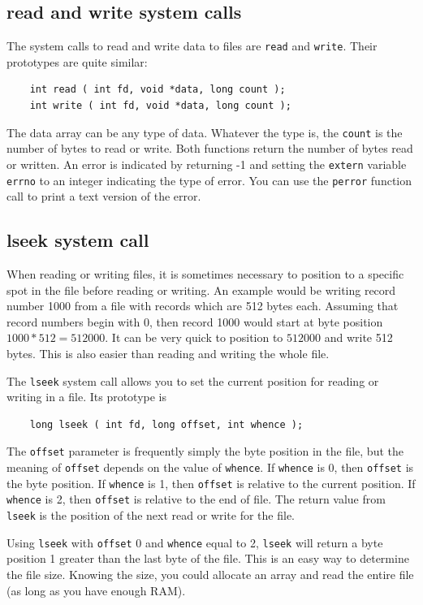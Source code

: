 \documentclass[11pt,b5paper]{book}
\begin{document}
\subsection{read and write system calls}

The system calls to read and write data to files are {\tt read} and {\tt write}.  
Their prototypes are quite similar:
\begin{verbatim}
    int read ( int fd, void *data, long count );
    int write ( int fd, void *data, long count );
\end{verbatim}
The data array can be any type of data.
Whatever the type is, the {\tt count} is the number of bytes to read or write.
Both functions return the number of bytes read or written.
An error is indicated by returning -1 and setting the {\tt extern} variable {\tt errno} to an
integer indicating the type of error.
You can use the {\tt perror} function call to print a text version of the
error.

\subsection{lseek system call}

When reading or writing files, it is sometimes necessary to position to a specific spot in the file before 
reading or writing.
An example would be writing record number 1000 from a file with records which are 512 bytes each.
Assuming that record numbers begin with 0, then record 1000 would start at byte position $1000*512=512000$.
It can be very quick to position to $512000$ and write 512 bytes.
This is also easier than reading and writing the whole file.

The {\tt lseek} system call allows you to set the current position for reading or writing in a file.
Its prototype is
\begin{verbatim}
    long lseek ( int fd, long offset, int whence );
\end{verbatim}
The {\tt offset} parameter is frequently simply the byte position in the file, but the meaning of {\tt offset} depends
on the value of {\tt whence}.
If {\tt whence} is 0, then {\tt offset} is the byte position.
If {\tt whence} is 1, then {\tt offset} is relative to the current position.
If {\tt whence} is 2, then {\tt offset} is relative to the end of file.
The return value from {\tt lseek} is the position of the next read or write for the file.

Using {\tt lseek} with {\tt offset} 0 and {\tt whence} equal to 2, {\tt lseek} will return
a byte position 1 greater than the last byte of the file.
This is an easy way to determine the file size.
Knowing the size, you could allocate an array and read the entire file (as long as you have enough RAM).
\end{document}
